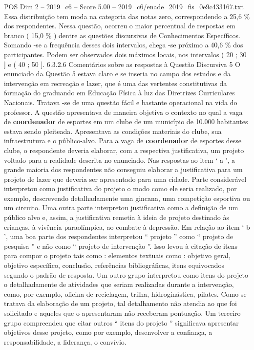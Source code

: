 \begin{textsample}{POS Dim 2 – 2019\_c6 – Score 5.00 – 2019\_c6/enade\_2019\_fis\_0e9c433167.txt}
Essa distribuição tem moda na categoria das notas zero, correspondendo a 25,6 \% dos respondentes.
Nessa questão, ocorreu o maior percentual de respostas em branco ( 15,0 \% ) dentre as questões discursivas de Conhecimentos Específicos.
Somando -se a frequência desses dois intervalos, chega -se próximo a 40,6 \% dos participantes.
Podem ser observados dois máximos locais, nos intervalos ( 20 ; 30 ] e ( 40 ; 50 ]. 6.3.2.6 Comentários sobre as respostas à Questão Discursiva 5 O enunciado da Questão 5 estava claro e se inseria no campo dos estudos e da intervenção em recreação e lazer, que é uma das vertentes constitutivas da formação do graduando em Educação Física à luz das Diretrizes Curriculares Nacionais.
Tratava -se de uma questão fácil e bastante operacional na vida do professor.
A questão apresentava de maneira objetiva o contexto no qual a vaga de \textbf{coordenador} de esportes em um clube de um município de 10.000 habitantes estava sendo pleiteada.
Apresentava as condições materiais do clube, sua infraestrutura e o público-alvo.
Para a vaga de \textbf{coordenador} de esportes desse clube, o respondente deveria elaborar, com a respectiva justificativa, um projeto voltado para a realidade descrita no enunciado.
Nas respostas ao item ‘ a ’, a grande maioria dos respondentes não conseguiu elaborar a justificativa para um projeto de lazer que deveria ser apresentado para uma cidade.
Parte considerável interpretou como justificativa do projeto o modo como ele seria realizado, por exemplo, descrevendo detalhadamente uma gincana, uma competição esportiva ou um circuito.
Uma outra parte interpretou justificativa como a definição de um público alvo e, assim, a justificativa remetia à ideia de projeto destinado às crianças, à vivência paraolímpica, ao combate à depressão.
Em relação ao item ‘ b ’, uma boa parte dos respondentes interpretou “ projeto ” como “ projeto de pesquisa ” e não como “ projeto de intervenção ”.
Isso levou à citação de itens para compor o projeto tais como : elementos textuais como : objetivo geral, objetivo específico, conclusão, referências bibliográficas, itens equivocados segundo o padrão de resposta.
Um outro grupo interpretou como itens do projeto o detalhadamente de atividades que seriam realizadas durante a intervenção, como, por exemplo, oficina de reciclagem, trilha, hidroginástica, pilates.
Como se tratava da elaboração de um projeto, tal detalhamento não atendia ao que foi solicitado e aqueles que o apresentaram não receberam pontuação.
Um terceiro grupo compreendeu que citar outros “ itens do projeto ” significava apresentar objetivos desse projeto, como por exemplo, desenvolver a confiança, a responsabilidade, a liderança, o convívio.

\end{textsample}
